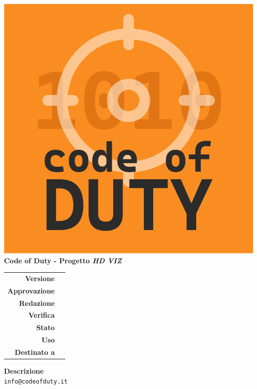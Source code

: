 %
%

\begin{titlepage}

	\begin{center}
		\includegraphics[scale = 0.5]{../_template/images/logo.png}\\
		\large \textbf{Code of Duty - Progetto \emph{HD VIZ}} \\
		\vfill
		\huge \textbf{\titolodocumento}
		\vspace*{\fill}
        
        \vfill
        \large
    \end{center}
    
	\begin{table}[htbp]
        \centering
        \begin{tabular}{r|l}
            \textbf{Versione} & \versione{} \\
            \textbf{Approvazione} & \approvazione{} \\ 
            \textbf{Redazione} & \redazione{} \\ 
            \textbf{Verifica} & \verifica{} \\ 
            \textbf{Stato} & \stato{} \\
            \textbf{Uso} & \uso{} \\
            \textbf{Destinato a} & \destinazione{}
        \end{tabular}
    \end{table}
    
    \begin{center}
        \vfill
        \normalsize
        \textbf{Descrizione}\\
		\descrizionedocumento
        \vfill
        \small
        \texttt{info@codeofduty.it}
	\end{center}
\end{titlepage}

%
